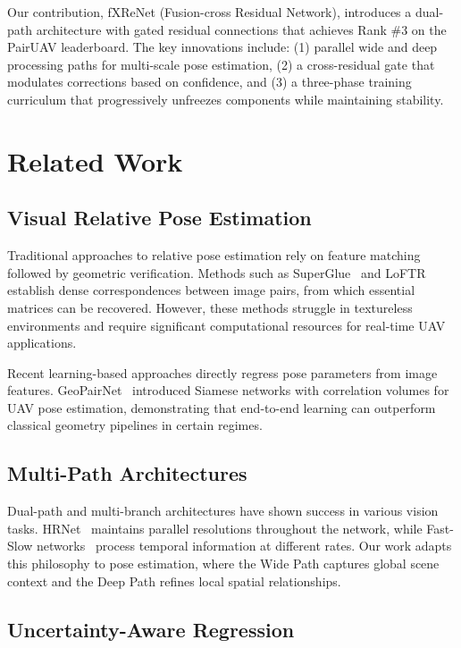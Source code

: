 \documentclass[sigconf,nonacm]{acmart}
\begin{document}
Our contribution, fXReNet (Fusion-cross Residual Network), introduces a dual-path architecture with gated residual connections that achieves Rank \#3 on the PairUAV leaderboard. The key innovations include: (1) parallel wide and deep processing paths for multi-scale pose estimation, (2) a cross-residual gate that modulates corrections based on confidence, and (3) a three-phase training curriculum that progressively unfreezes components while maintaining stability.

\section{Related Work}

\subsection{Visual Relative Pose Estimation}

Traditional approaches to relative pose estimation rely on feature matching followed by geometric verification. Methods such as SuperGlue~\cite{superglue} and LoFTR~\cite{loftr} establish dense correspondences between image pairs, from which essential matrices can be recovered. However, these methods struggle in textureless environments and require significant computational resources for real-time UAV applications.

Recent learning-based approaches directly regress pose parameters from image features. GeoPairNet~\cite{geopairnet} introduced Siamese networks with correlation volumes for UAV pose estimation, demonstrating that end-to-end learning can outperform classical geometry pipelines in certain regimes.

\subsection{Multi-Path Architectures}

Dual-path and multi-branch architectures have shown success in various vision tasks. HRNet~\cite{hrnet} maintains parallel resolutions throughout the network, while Fast-Slow networks~\cite{fastslow} process temporal information at different rates. Our work adapts this philosophy to pose estimation, where the Wide Path captures global scene context and the Deep Path refines local spatial relationships.

\subsection{Uncertainty-Aware Regression}
\end{document}
